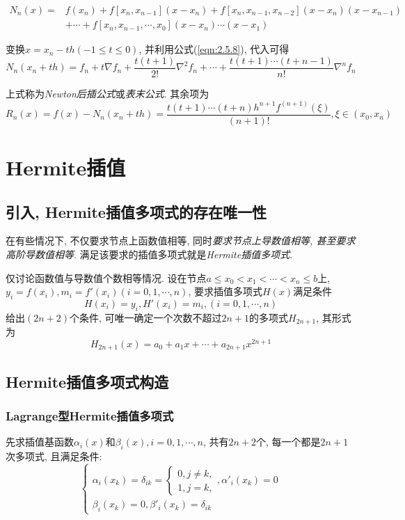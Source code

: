 \begin{align*}
    N_n(x)=&f(x_n)+f[x_n,x_{n-1}](x-x_n)+f[x_n,x_{n-1},x_{n-2}](x-x_n)(x-x_{n-1})\\
    &+\cdots+f[x_n,x_{n-1},\cdots,x_0](x-x_n)\cdots(x-x_1)
\end{align*}

变换$x=x_n-th(-1\le t\le0)$, 并利用公式(\ref{eqn:2.5.8}), 代入可得
\begin{equation*}
    N_n(x_n+th)=f_n+t\nabla f_n+\frac{t(t+1)}{2!}\nabla^2f_n+\cdots+\frac{t(t+1)\cdots(t+n-1)}{n!}\nabla^nf_n
\end{equation*}

上式称为\emph{Newton后插公式}或\emph{表末公式}. 其余项为
\begin{equation*}
    R_n(x)=f(x)-N_n(x_n+th)=\frac{t(t+1)\cdots(t+n)h^{n+1}f^{(n+1)}(\xi)}{(n+1)!}, \xi\in(x_0,x_n)
\end{equation*}

\section{Hermite插值}

\subsection{引入, Hermite插值多项式的存在唯一性}
在有些情况下, 不仅要求节点上函数值相等, 同时\emph{要求节点上导数值相等, 甚至要求高阶导数值相等}. 满足该要求的插值多项式就是\emph{Hermite插值多项式}.

仅讨论函数值与导数值个数相等情况. 设在节点$a\le x_0<x_1<\cdots<x_n\le b$上, $y_i=f(x_i), m_i=f'(x_i)(i=0,1,\cdots,n)$, 要求插值多项式$H(x)$满足条件
\begin{equation*}
    H(x_i)=y_i, H'(x_i)=m_i, (i=0,1,\cdots,n)
\end{equation*}
给出$(2n+2)$个条件, 可唯一确定一个次数不超过$2n+1$的多项式$H_{2n+1}$, 其形式为
\begin{equation*}
    H_{2n+1}(x)=a_0+a_1x+\cdots+a_{2n+1}x^{2n+1}
\end{equation*}

\subsection{Hermite插值多项式构造}

\subsubsection{Lagrange型Hermite插值多项式}
先求插值基函数$\alpha_i(x)$和$\beta_i(x),i=0,1,\cdots,n$, 共有$2n+2$个, 每一个都是$2n+1$次多项式, 且满足条件:
\begin{equation*}
    \begin{cases}
        \alpha_i(x_k)=\delta_{ik}=
        \begin{cases}
            0, j\ne k,\\
            1, j=k,
        \end{cases}, \alpha'_i(x_k)=0\\
        \beta_i(x_k)=0, \beta'_i(x_k)=\delta_{ik}
    \end{cases}
\end{equation*}

